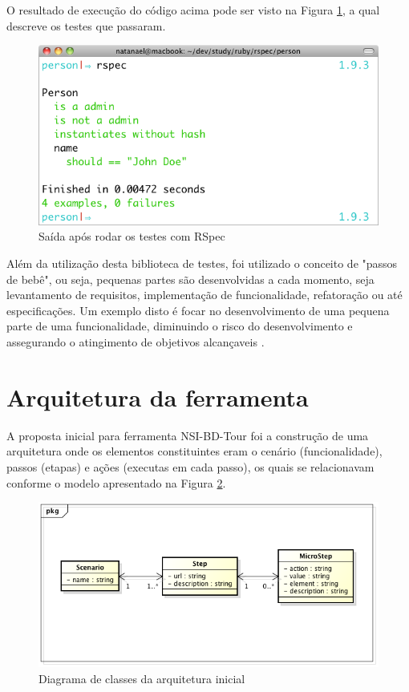 O resultado de execução do código acima pode ser visto na Figura \ref{figura_31}, a qual descreve os testes que passaram.

\begin{figure}[ht]
    \centering
    \includegraphics[width=0.9 \textwidth]{figuras/figura_31}
    \caption{Saída após rodar os testes com RSpec}
    \label{figura_31}
\end{figure}

Além da utilização desta biblioteca de testes, foi utilizado o conceito de "passos de bebê", ou seja, pequenas partes são desenvolvidas a cada momento, seja levantamento de requisitos, implementação de funcionalidade, refatoração ou até especificações. Um exemplo disto é focar no desenvolvimento de uma pequena parte de uma funcionalidade, diminuindo o risco do desenvolvimento e assegurando o atingimento de objetivos alcançaveis \cite{RODRIGO}.

\section{Arquitetura da ferramenta}

A proposta inicial para ferramenta NSI-BD-Tour foi a construção de uma arquitetura onde os elementos constituintes eram o cenário (funcionalidade), passos (etapas) e ações (executas em cada passo), os quais se relacionavam conforme o modelo apresentado na Figura \ref{figura_32}.

\begin{figure}[ht]
    \centering
    \includegraphics[width=0.5 \textwidth]{figuras/figura_32}
    \caption{Diagrama de classes da arquitetura inicial}
    \label{figura_32}
\end{figure}

